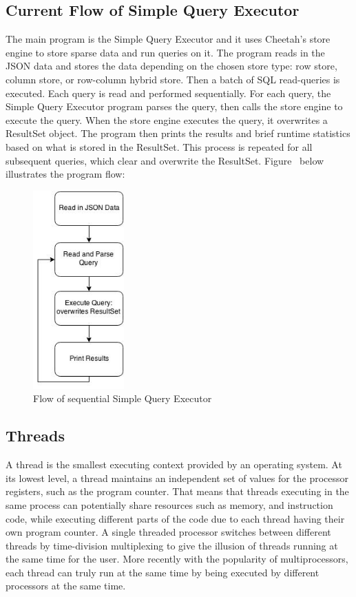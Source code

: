 \documentclass[11pt,journal,compsoc]{IEEEtran}
\begin{document}
\subsection{Current Flow of Simple Query Executor}

The main program is the Simple Query Executor and it uses Cheetah’s store engine to store sparse data and run queries on it. The program reads in the JSON data and stores the data depending on the chosen store type: row store, column store, or row-column hybrid store. Then a batch of SQL read-queries is executed. Each query is read and performed sequentially. For each query, the Simple Query Executor program parses the query, then calls the store engine to execute the query. When the store engine executes the query, it overwrites a ResultSet object. The program then prints the results and brief runtime statistics based on what is stored in the ResultSet. This process is repeated for all subsequent queries, which clear and overwrite the ResultSet. Figure~\cite{fig_sequential_query} below illustrates the program flow:

\begin{figure}[!t]
\centering
\includegraphics[height=3in]{images/query_sequential}
\caption{Flow of sequential Simple Query Executor}
\label{fig_sequential_query}
\end{figure}

\subsection{Threads}
A thread is the smallest executing context provided by an operating system. At its lowest level, a thread maintains an independent set of values for the processor registers, such as the program counter. That means that threads executing in the same process can potentially share resources such as memory, and instruction code, while executing different parts of the code due to each thread having their own program counter. A single threaded processor switches between different threads by time-division multiplexing to give the illusion of threads running at the same time for the user. More recently with the popularity of multiprocessors, each thread can truly run at the same time by being executed by different processors at the same time.
\end{document}
